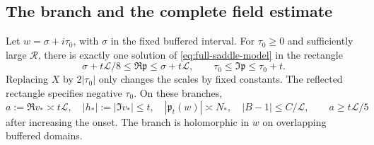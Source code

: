 \subsection{The branch and the complete field estimate}
\begin{lemma}\label{lem:full-saddle-branch}
Let $w=\sigma+i\tau_0$, with $\sigma$ in the fixed buffered interval.
For $\tau_0\ge0$ and sufficiently large $\mathcal R$, there is exactly
one solution of \eqref{eq:full-saddle-model} in the rectangle
\begin{equation}
 \sigma+t\mathcal L/8\le\Re\mathfrak p\le\sigma+t\mathcal L,
 \qquad \tau_0\le\Im\mathfrak p\le\tau_0+t.
 \label{eq:full-saddle-rectangle}
\end{equation}
Replacing $X$ by $2|\tau_0|$ only changes the scales by fixed constants.
The reflected rectangle specifies negative $\tau_0$. On these branches,
\begin{equation}
 a:=\Re v_*\asymp t\mathcal L,\quad
 |h_*|:=|\Im v_*|\le t,\quad
 |\mathfrak p_t(w)|\asymp N_*,\quad |B-1|\le C/\mathcal L,
 \qquad a\ge t\mathcal L/5
 \label{eq:full-saddle-branch-bounds}
\end{equation}
after increasing the onset. The branch is holomorphic in $w$ on
overlapping buffered domains.
\end{lemma}
